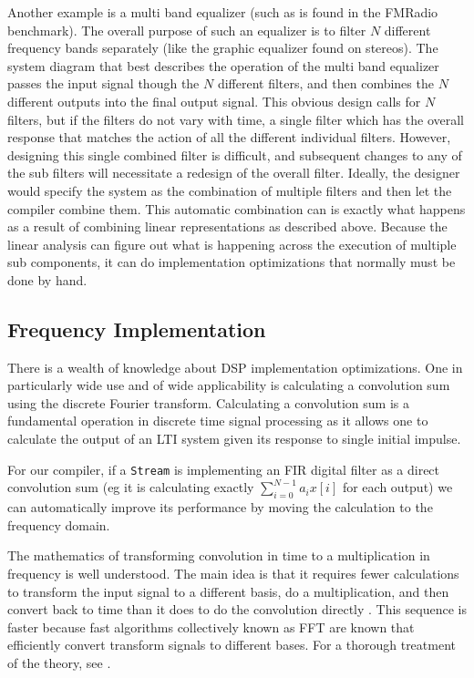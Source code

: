 Another example is a multi band equalizer (such as is found in the FMRadio benchmark). 
The overall purpose of such an equalizer is to filter $N$ different frequency bands 
separately (like the graphic equalizer found on stereos). 
The system diagram that best describes the operation of the multi band equalizer
passes the input signal though the $N$ different filters, and then combines the $N$
different outputs into the final output signal.
This obvious design calls for $N$ filters, but if the filters do not vary with time, 
a single filter which has the overall response that matches the action of all the 
different individual filters. However, designing this single combined filter is 
difficult, and subsequent changes to any of the sub filters will necessitate a
redesign of the overall filter. Ideally, the designer would specify the system as
the combination of multiple filters and then let the compiler combine them. 
This automatic combination can is exactly what happens as a result of combining
linear representations as described above. Because the linear analysis can
figure out what is happening across the execution of multiple sub components, 
it can do implementation optimizations that normally must be done by hand.


\subsection{Frequency Implementation}
There is a wealth of knowledge about DSP implementation optimizations. One in
particularly wide use and of wide applicability is calculating a convolution sum 
using the discrete Fourier transform. Calculating a convolution sum is a fundamental
operation in discrete time signal processing as it allows one to calculate the output
of an LTI system given its response to single initial impulse.

For our compiler, if a {\tt Stream} is implementing an FIR digital filter as a direct 
convolution sum (eg it is calculating exactly $\sum_{i=0}^{N-1}a_{i}x[i]$ for each output)
we can automatically improve its performance by moving the calculation to the frequency
domain. 

The mathematics of transforming convolution in time to a multiplication in frequency 
is well understood. The main idea is that it requires fewer calculations to transform
the input signal to a different basis, do a multiplication, and then convert back 
to time than it does to do the convolution directly . This sequence is faster because 
fast algorithms collectively known as FFT are known that efficiently convert transform
signals to different bases. For a thorough treatment of the theory, see
\cite{oppenheim-discrete}.

